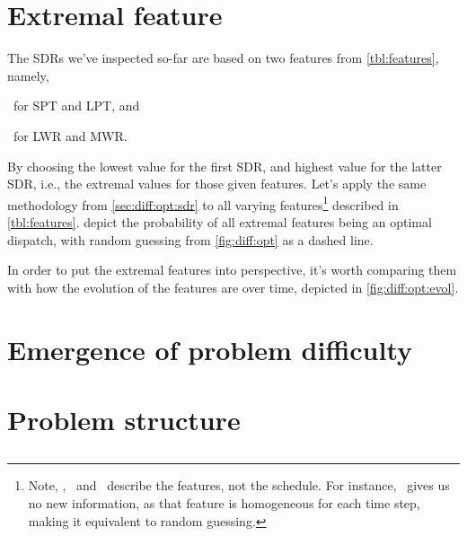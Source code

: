 \section{Extremal feature}\label{sec:diff:opt:ext}
The SDRs we've inspected so-far are based on two features from \cref{tbl:features}, namely, 
\begin{inparaenum}[(i)]
\item \phiproc\ for SPT and LPT, and
\item \phiwrmJob\ for LWR and MWR. 
\end{inparaenum}
By choosing the lowest value for the first SDR, and highest value for the latter SDR, i.e., the extremal values for those given features. Let's apply the same methodology from \cref{sec:diff:opt:sdr} to all varying features\footnote{Note, \phistep, \phimac\ and \phiwrmTotal\ describe the features, not the schedule. For instance, \phistep\, gives us no new information, as that feature is homogeneous for each time step, making it equivalent to random guessing.} described in \cref{tbl:features}. 
depict the probability of all extremal features being an optimal dispatch, with random guessing from \cref{fig:diff:opt} as a dashed line. 

In order to put the extremal features into perspective, it's worth comparing them with how the evolution of the features are over time, depicted in \cref{fig:diff:opt:evol}. 


\section{Emergence of problem difficulty}\label{sec:diff:stepwise}


\section{Problem structure}
\subsection{\Jrnd}\label{sec:diff:jrnd}
\subsection{\Jrndn}\label{sec:diff:jrndn}
\subsection{\Frnd}\label{sec:diff:frnd}
\subsection{\Frndn}\label{sec:diff:frndn}
